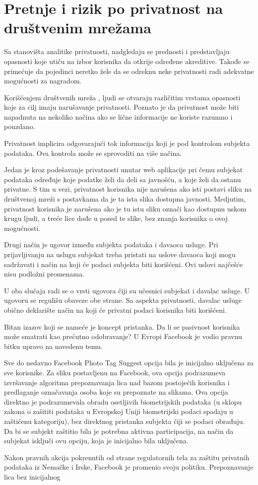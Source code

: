 \documentclass[a4paper]{article}
\begin{document}
\section{Pretnje i rizik po privatnost na društvenim  mrežama}
Sa stanovišta analitike privatnosti, nadgledaju se prednosti i predstavljaju opasnosti koje utiču na izbor korisnika da otkrije određene  akreditive. Takođe se primećuje da pojedinci neretko žele da se  odreknu neke privatnosti radi adekvatne mogućnosti za nagradom.\par Korišćenjem društvenih mreža \cite{Patrick}, ljudi se otvaraju različitim vrstama opasnosti koje za cilj imaju narušavanje privatnosti. Poznato je da privatnost može biti napadnuta na nekoliko načina  ako se lične informacije ne koriste razumno  i pouzdano. \par Privatnost implicira odgovarajući tok informacija koji je pod kontrolom subjekta podataka. Ova kontrola može se sprovoditi na više načina. \par Jedan je kroz podešavanje privatnosti unutar web aplikacije pri čemu subjekat podataka određuje koje podatke želi da deli sa javnošću, a koje želi da ostanu privatne. S tim u vezi, privatnost korisnika nije narušena ako isti postavi sliku na društvenoj mreži s postavkama da je ta ista slika dostupna javnosti. Medjutim, privatnost korisnika je narušena ako je tu istu sliku označi kao dostupnu uskom krugu ljudi, a treće lice dođe u posed te slike, bez znanja korisnika o ovoj mogućnosti. \par Drugi način je ugovor između subjekta podataka i davaoca usluge. Pri prijavljivanju na uslugu subjekat treba pristati na uslove davaoca koji mogu sadržavati i način na koji će podaci subjekta biti korišćeni. Ovi uslovi najčešće nisu podložni promenama.\par  U oba slučaja radi se o vrsti ugovora čiji su učesnici subjekat i davalac usluge. U ugovoru se regulišu obaveze obe strane. Sa aspekta privatnosti, davalac usluge obično deklarište način na koji će privatni podaci korisnika biti korišćeni. \par Bitan izazov koji se nameće je koncept pristanka. Da li se pasivnost korisnika može smatrati kao prećutno odobravanje? U Evropi Facebook je vodio pravnu bitku upravo na navedenu temu.\par  Sve do nedavno Facebook Photo Tag Suggest opcija bila je inicijalno uključena za sve korisnike. Za sliku postavljenu na Facebook, ova opcija podrazumeva izvršavanje algoritma prepoznavanja lica nad bazom postojećih korisnika i predlaganje označavanja osoba koje su prepoznate na slikama. Ova opcija direktno je podrazumevala obradu osetljivih biometrijskih podataka (u sklopu zakona o zašititi podataka u Evropskoj Uniji biometrijski podaci spadaju u zaštićenu kategoriju), bez direktnog pristanka subjekta čiji se podaci obrađuju. Da bi se subjekt zaštitio bila je potrebna aktivna participacija, na način da subjekat isključi ovu opciju, koja je inicijalno bila uključena. \par Nakon pravnih akcija pokrenutih od strane regulatornih tela za zaštitu privatnih podataka iz Nemačke i Irske, Facebook je promenio svoju politiku. Prepoznavanje lica bez inicijalnog 
\end{document}
